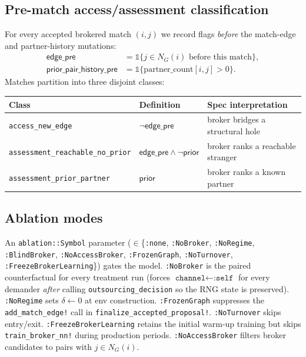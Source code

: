 \documentclass[11pt,a4paper]{article}
\begin{document}
\subsection{Pre-match access/assessment classification}
For every accepted brokered match $(i,j)$ we record flags \emph{before} the match-edge and partner-history mutations:
\begin{align*}
\mathsf{edge\_pre} &= \mathbb{1}\{j \in N_G(i)\text{ before this match}\},\\
\mathsf{prior\_pair\_history\_pre} &= \mathbb{1}\{\text{partner\_count}[i,j] > 0\}.
\end{align*}
Matches partition into three disjoint classes:
\begin{center}\small
\begin{tabular}{@{}lll@{}}
\toprule
Class & Definition & Spec interpretation\\
\midrule
\texttt{access\_new\_edge} & $\neg\mathsf{edge\_pre}$ & broker bridges a structural hole \\
\texttt{assessment\_reachable\_no\_prior} & $\mathsf{edge\_pre}\wedge\neg\mathsf{prior}$ & broker ranks a reachable stranger \\
\texttt{assessment\_prior\_partner} & $\mathsf{prior}$ & broker ranks a known partner \\
\bottomrule
\end{tabular}
\end{center}

\subsection{Ablation modes}
An \texttt{ablation::Symbol} parameter ($\in$\{\texttt{:none}, \texttt{:NoBroker}, \texttt{:NoRegime}, \texttt{:BlindBroker}, \texttt{:NoAccessBroker}, \texttt{:FrozenGraph}, \texttt{:NoTurnover}, \texttt{:FreezeBrokerLearning}\}) gates the model. \texttt{:NoBroker} is the paired counterfactual for every treatment run (forces $\texttt{channel}\leftarrow\texttt{:self}$ for every demander \emph{after} calling \texttt{outsourcing\_decision} so the RNG state is preserved). \texttt{:NoRegime} sets $\delta \leftarrow 0$ at env construction. \texttt{:FrozenGraph} suppresses the \texttt{add\_match\_edge!} call in \texttt{finalize\_accepted\_proposal!}. \texttt{:NoTurnover} skips entry/exit. \texttt{:FreezeBrokerLearning} retains the initial warm-up training but skips \texttt{train\_broker\_nn!} during production periods. \texttt{:NoAccessBroker} filters broker candidates to pairs with $j \in N_G(i)$.
\end{document}
